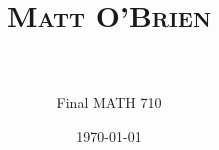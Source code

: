 \documentclass[paper=a4, fontsize=11pt]{scrartcl} %
\title{	
\normalfont \normalsize 
\textsc{Matt O'Brien} \\ [25pt] %
\horrule{0.5pt} \\[0.4cm] %
}
\author{Final MATH 710}
\date{\normalsize\today} %
\begin{document}
\maketitle %
\begin{comment}
\begin{align*}
\int_E (f \cdot \chi A) &= \int_{E/A} (f \cdot \chi A) + \int_A (f \cdot \chi A) \text{ ,by linearity properties of the integral}.
\\  &= 0  + \int_A (f \cdot \chi A) \text{ , by definition of characteristic function}
\\  &=  \int_A (f \cdot \ 1) \text{ , by definition of characteristic function}
\end{align*} 
ok here is the cheetshee for piecewise functions
$$
f(n) =
\begin{cases}
n/2, & \text{if }n\text{ is even} \\
3n+1, & \text{if }n\text{ is odd}
\end{cases}
$$
\end{comment}	

\end{document}
